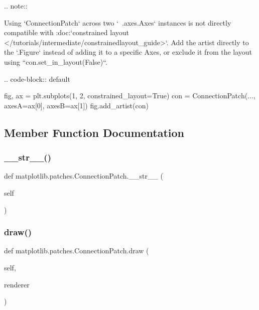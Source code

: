 \begin{DoxyVerb}
.. note::

   Using `ConnectionPatch` across two `~.axes.Axes` instances
   is not directly compatible with :doc:`constrained layout
   </tutorials/intermediate/constrainedlayout_guide>`. Add the artist
   directly to the `.Figure` instead of adding it to a specific Axes,
   or exclude it from the layout using ``con.set_in_layout(False)``.

   .. code-block:: default

      fig, ax = plt.subplots(1, 2, constrained_layout=True)
      con = ConnectionPatch(..., axesA=ax[0], axesB=ax[1])
      fig.add_artist(con)\end{DoxyVerb}
 

\subsection{Member Function Documentation}
\mbox{\label{classmatplotlib_1_1patches_1_1ConnectionPatch_a54f8ca8cd2c025488440c8a673471175}} 
\subsubsection{\texorpdfstring{\+\_\+\+\_\+str\+\_\+\+\_\+()}{\_\_str\_\_()}}
{\footnotesize\ttfamily def matplotlib.\+patches.\+Connection\+Patch.\+\_\+\+\_\+str\+\_\+\+\_\+ (\begin{DoxyParamCaption}\item[{}]{self }\end{DoxyParamCaption})}

\mbox{\label{classmatplotlib_1_1patches_1_1ConnectionPatch_a33cdbebec3df9036458f8a08f7de5c5f}} 
\subsubsection{\texorpdfstring{draw()}{draw()}}
{\footnotesize\ttfamily def matplotlib.\+patches.\+Connection\+Patch.\+draw (\begin{DoxyParamCaption}\item[{}]{self,  }\item[{}]{renderer }\end{DoxyParamCaption})}

